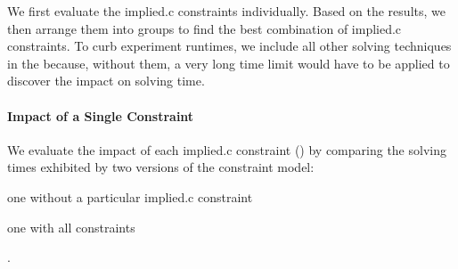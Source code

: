 \newsavebox{\solvTechPlot}
\newlength{\solvTechPlotW}
\newlength{\solvTechSubfigW}

We first evaluate the \gls{implied.c} \glspl{constraint} individually.
%
Based on the results, we then arrange them into groups to find the best
combination of \gls{implied.c} \glspl{constraint}.
%
To curb experiment runtimes, we include all other solving techniques in the
 because, without them, a very long time limit
would have to be applied to discover the impact on solving time.


\paragraph{Impact of a Single Constraint}

We evaluate the impact of each \gls{implied.c} \gls{constraint}
()
by comparing the solving times exhibited by two versions of the \gls{constraint
  model}:
%
\begin{modelList}
  \item {}
    one without a particular \gls{implied.c} \gls{constraint}
  \item {}
    one with all \glspl{constraint}
\end{modelList}.

